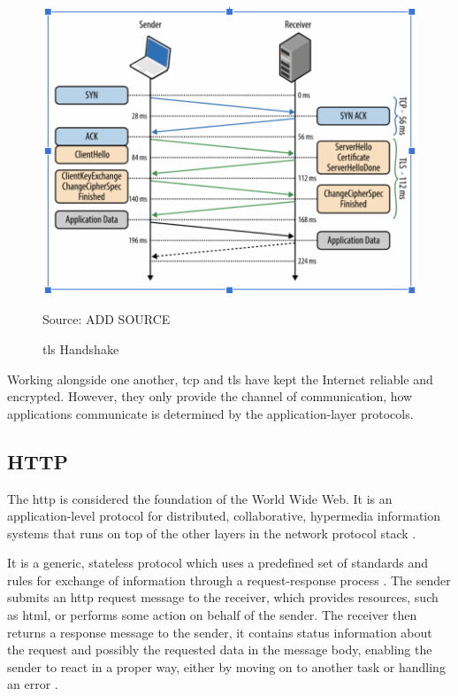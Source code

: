 \begin{figure}[ht]
    \centering
    \includegraphics[width=\linewidth]{figures/tls_handshake.png}
    \caption{\gls{tls} Handshake}
    {Source: ADD SOURCE}
    \label{figure:tls_handshake}
\end{figure}

Working alongside one another, \gls{tcp} and \gls{tls} have kept the Internet reliable and encrypted. However, they only provide the channel of communication, how applications communicate is determined by the application-layer protocols.

\subsection{HTTP}

The \gls{http} is considered the foundation of the World Wide Web. It is an application-level protocol for distributed, collaborative, hypermedia information systems that runs on top of the other layers in the network protocol stack \cite{rfc1945, rfc2616, what_is_http}.

It is a generic, stateless protocol which uses a predefined set of standards and rules for exchange of information through a request-response process \cite{rfc1945, rfc2616}. The sender submits an \gls{http} request message to the receiver, which provides resources, such as \gls{html}, or performs some action on behalf of the sender. The receiver then returns a response message to the sender, it contains status information about the request and possibly the requested data in the message body, enabling the sender to react in a proper way, either by moving on to another task or handling an error \cite{rfc2616}.

